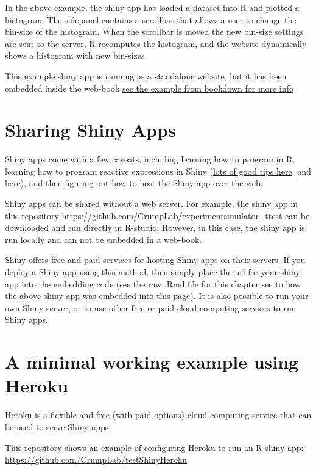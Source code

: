 \documentclass[
]{book}
\begin{document}
In the above example, the shiny app has loaded a dataset into R and plotted a histogram. The sidepanel contains a scrollbar that allows a user to change the bin-size of the histogram. When the scrollbar is moved the new bin-size settings are sent to the server, R recomputes the histogram, and the website dynamically shows a histogram with new bin-sizes.

This example shiny app is running as a standalone website, but it has been embedded inside the web-book \href{https://bookdown.org/yihui/bookdown/web-pages-and-shiny-apps.html}{see the example from bookdown for more info}

\hypertarget{sharing-shiny-apps}{%
\section{Sharing Shiny Apps}\label{sharing-shiny-apps}}

Shiny apps come with a few caveats, including learning how to program in R, learning how to program reactive expressions in Shiny (\href{https://shiny.rstudio.com/tutorial/}{lots of good tips here}, and \href{https://shiny.rstudio.com/articles/}{here}), and then figuring out how to host the Shiny app over the web.

Shiny apps can be shared without a web server. For example, the shiny app in this repository \url{https://github.com/CrumpLab/experimentsimulator_ttest} can be downloaded and run directly in R-studio. However, in this case, the shiny app is run locally and can not be embedded in a web-book.

Shiny offers free and paid services for \href{https://www.shinyapps.io}{hosting Shiny apps on their servers}. If you deploy a Shiny app using this method, then simply place the url for your shiny app into the embedding code (see the raw .Rmd file for this chapter see to how the above shiny app was embedded into this page). It is also possible to run your own Shiny server, or to use other free or paid cloud-computing services to run Shiny apps.

\hypertarget{a-minimal-working-example-using-heroku}{%
\section{A minimal working example using Heroku}\label{a-minimal-working-example-using-heroku}}

\href{https://www.heroku.com}{Heroku} is a flexible and free (with paid options) cloud-computing service that can be used to serve Shiny apps.

This repository shows an example of configuring Heroku to run an R shiny app: \url{https://github.com/CrumpLab/testShinyHeroku}

  
\end{document}
